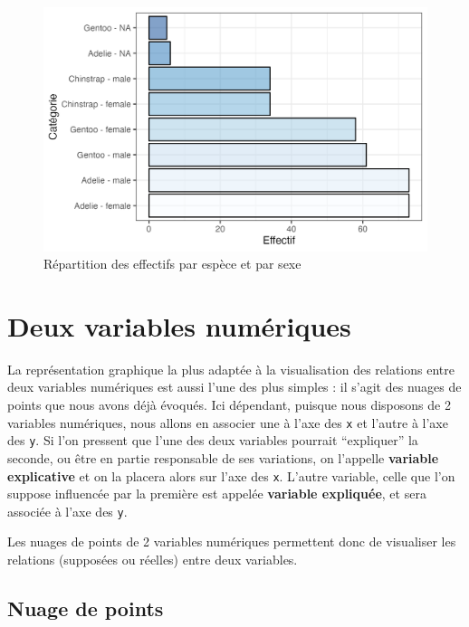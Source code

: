 \documentclass[
  letterpaper,
  DIV=11,
  numbers=noendperiod]{scrreprt}
\begin{document}
\begin{figure}

{\centering \includegraphics{./03-visualization_files/figure-pdf/fig-bpspecies-sex-1.png}

}

\caption{\label{fig-bpspecies-sex}Répartition des effectifs par espèce
et par sexe}

\end{figure}

\hypertarget{deux-variables-numuxe9riques}{%
\section{Deux variables numériques}\label{deux-variables-numuxe9riques}}

La représentation graphique la plus adaptée à la visualisation des
relations entre deux variables numériques est aussi l'une des plus
simples : il s'agit des nuages de points que nous avons déjà évoqués.
Ici dépendant, puisque nous disposons de 2 variables numériques, nous
allons en associer une à l'axe des \texttt{x} et l'autre à l'axe des
\texttt{y}. Si l'on pressent que l'une des deux variables pourrait
``expliquer'' la seconde, ou être en partie responsable de ses
variations, on l'appelle \textbf{variable explicative} et on la placera
alors sur l'axe des \texttt{x}. L'autre variable, celle que l'on suppose
influencée par la première est appelée \textbf{variable expliquée}, et
sera associée à l'axe des \texttt{y}.

Les nuages de points de 2 variables numériques permettent donc de
visualiser les relations (supposées ou réelles) entre deux variables.

\hypertarget{nuage-de-points}{%
\subsection{Nuage de points}\label{nuage-de-points}}
\end{document}

